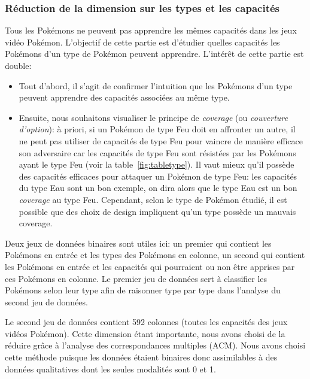 \documentclass[a4paper,12pt]{article}
\begin{document}
\subsubsection{Réduction de la dimension sur les types et les capacités}
Tous les Pokémons ne peuvent pas apprendre les mêmes capacités dans les jeux
vidéo Pokémon. L'objectif de cette partie est d'étudier quelles capacités les
Pokémons d'un type de Pokémon peuvent apprendre. L'intérêt de cette partie est
double:   
\begin{itemize}
    \item 
    Tout d'abord, il s'agit de confirmer l'intuition que les Pokémons d'un type
    peuvent apprendre des capacités associées au même type. 
    \item Ensuite, nous souhaitons visualiser le principe de \textit{coverage}
    (ou \textit{couverture d'option}): à priori, si un Pokémon de type Feu doit
    en affronter un autre, il ne peut pas utiliser de capacités de type Feu pour
    vaincre de manière efficace son adversaire car les capacités de type Feu
    sont résistées par les Pokémons ayant le type Feu (voir la
    table~\ref{fig:tabletype}). Il vaut mieux qu'il possède des capacités
    efficaces pour attaquer un Pokémon de type Feu: les capacités du type Eau
    sont un bon exemple, on dira alors que le type Eau est un bon
    \textit{coverage} au type Feu. Cependant, selon le type de Pokémon étudié,
    il est possible que des choix de design impliquent qu'un type possède un
    mauvais coverage. 
\end{itemize}
Deux jeux de données binaires sont utiles ici: un premier qui contient les
Pokémons en entrée et les types des Pokémons en colonne, un second qui contient
les Pokémons en entrée et les capacités qui pourraient ou non être apprises
par ces Pokémons en colonne. Le premier jeu de données sert à classifier les
Pokémons selon leur type afin de raisonner type par type dans l'analyse du
second jeu de données.

Le second jeu de données contient 592 colonnes (toutes les capacités des jeux
vidéos Pokémon). Cette dimension étant importante, nous avons choisi de la
réduire grâce à l'analyse des correspondances multiples (ACM). Nous avons choisi
cette méthode puisque les données étaient binaires donc assimilables à des
données qualitatives dont les seules modalités sont 0 et 1. 
\end{document}
